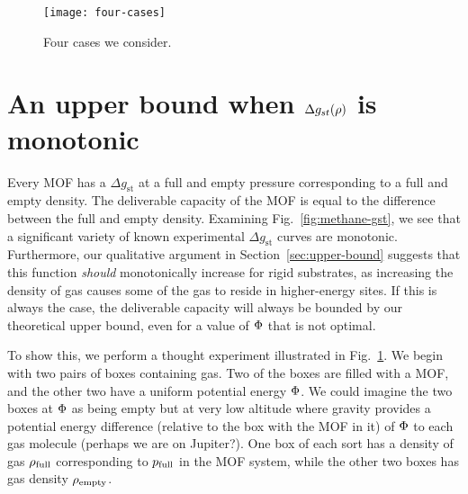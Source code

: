 \begin{figure}
    \centering
    \texttt{[image: four-cases]}
    \caption{Four cases we consider. }
    \label{fig:delta-gst-maximum}
\end{figure}

\section{An upper bound when $\Delta g_{st}(\rho)$ is monotonic}\label{sec:monotonic}
Every MOF has a $\Delta g_\text{st}$ at a full and empty pressure corresponding
to a full and empty density. The deliverable capacity of the MOF is equal to
the difference between the full and empty density. Examining
Fig.~\ref{fig:methane-gst}, we see that a significant variety of known
experimental $\Delta g_\text{st}$ curves are monotonic. Furthermore, our
qualitative argument in Section~\ref{sec:upper-bound} suggests that this
function \emph{should} monotonically increase for rigid substrates, as
increasing the density of gas causes some of the gas to reside in higher-energy
sites. If this is always the case, the deliverable capacity will always be
bounded by our theoretical upper bound, even for a value of $\Phi$ that is not
optimal.

To show this, we perform a thought experiment illustrated in
Fig.~\ref{fig:delta-gst-maximum}. We begin with two pairs of boxes containing
gas. Two of the boxes are filled with a MOF, and the other two have a uniform
potential energy $\Phi$. We could imagine the two boxes at $\Phi$ as being empty
but at very low altitude where gravity provides a potential energy difference
(relative to the box with the MOF in it) of $\Phi$ to each gas molecule (perhaps
we are on Jupiter?). One box of each sort has a density of gas $\rho_{\text{full}}$
corresponding to $p_{\text{full}}$ in the MOF system, while the other two boxes has gas
density $\rho_{\text{empty}}$.

